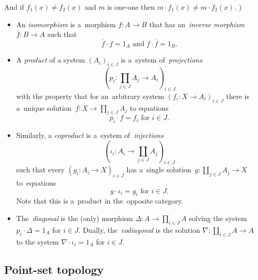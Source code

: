  And if $f_1(x) \ne f_2(x)$ and $m$ is one-one then $m \cdot f_1(x) \ne m \cdot
 f_2(x)$.
 )

\begin{itemize}
\item An \emph{isomorphism} is a~morphism $f\colon A \to B$ that has
an~\emph{inverse morphism\/} $\overline{f}\colon B \to A$ such that
\[
  \overline{f} \cdot f = 1_A \text{ and } f \cdot \overline{f} = 1_B.
\]
\end{itemize}

\begin{itemize}
\item A \emph{product} of a system $\left(A_i\right)_{i\in J}$ is a~system
of~\emph{projections\/}
\[
  \left(p_i\colon \prod_{j\in J} A_j \to A_i \right)_{i\in J}
\]
with the property that for an~arbitrary system $\left(f_i\colon X \to
A_i\right)_{i\in J}$ there is a~unique solution~$f\colon X \to \prod_{j\in
J} A_j$ to equations
\[
  p_i \cdot f = f_i \text{ for } i\in J.
\]

\item Similarly, a \emph{coproduct} is a~system of~\emph{injections\/}
\[
  \left(\iota_i\colon A_i \to \coprod_{j\in J} A_j \right)_{i\in J}
\]
such that every $\left(g_i\colon A_i \to X \right)_{i\in J}$ has a~single
solution~$g\colon \coprod_{j\in J} A_j \to X$ to~equations
\[
  g \cdot \iota_i = g_i \text{ for } i\in J.
\]
Note that this is a~product in the~opposite category.

\item The~\emph{diagonal} is the (only) morphism $\Delta\colon A \to \prod_{i\in
J} A$ solving the system $p_i\cdot \Delta = 1_A$ for $i \in J$.
Dually, the~\emph{codiagonal} is the solution $\nabla\colon \coprod_{i\in J} A
\to A$ to the system $\nabla\cdot \iota_i = 1_A$ for $i \in J$.
\end{itemize}


\subsection*{Point-set topology}

